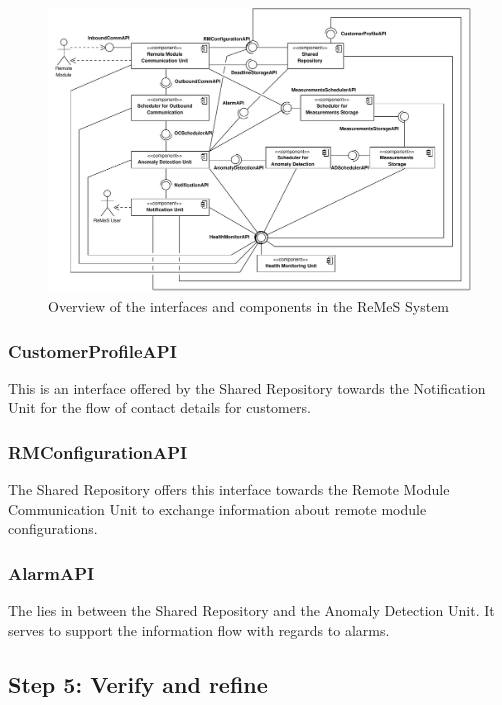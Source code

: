 \begin{figure}[H]
	\begin{centering}
		\includegraphics[width=1.4\textwidth,angle=90]{figs/add-it1-interfaces.pdf}
		\caption{Overview of the interfaces and components in the ReMeS
		System}
		\label{fig:it1/interfaces}
	\end{centering}
\end{figure}

\subsubsection{CustomerProfileAPI}

\npar This is an interface offered by the Shared Repository towards the
Notification Unit for the flow of contact details for customers.

\subsubsection{RMConfigurationAPI}

\npar The Shared Repository offers this interface towards the Remote Module
Communication Unit to exchange information about remote module configurations.

\subsubsection{AlarmAPI}

\npar The  lies in between the Shared Repository and the
Anomaly Detection Unit. It serves to support the information flow with regards
to alarms.

\subsection{Step 5: Verify and refine}
\label{add:it1/verification}


